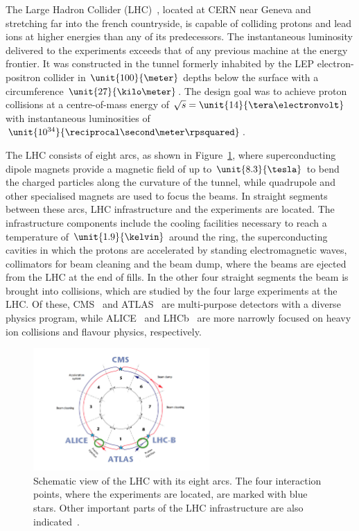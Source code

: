The Large Hadron Collider (LHC)~\cite{LHC}, located at CERN near Geneva and stretching far into the french countryside, is capable of colliding protons and lead ions at higher energies than any of its predecessors. The instantaneous luminosity delivered to the experiments exceeds that of any previous machine at the energy frontier. It was constructed in the tunnel formerly inhabited by the LEP electron-positron collider in $\unit{100}{\meter}$ depths below the surface with a circumference $\unit{27}{\kilo\meter}$. The design goal was to achieve proton collisions at a centre-of-mass energy of $\sqrt{s} = \unit{14}{\tera\electronvolt}$ with instantaneous luminosities of $\unit{10^{34}}{\reciprocal\second\meter\rpsquared}$. 

The LHC consists of eight arcs, as shown in Figure~\ref{fig:LHC}, where superconducting dipole magnets provide a magnetic field of up to $\unit{8.3}{\tesla}$ to bend the charged particles along the curvature of the tunnel, while quadrupole and other specialised magnets are used to focus the beams. In straight segments between these arcs, LHC infrastructure and the experiments are located. The infrastructure components include the cooling facilities necessary to reach a temperature of $\unit{1.9}{\kelvin}$ around the ring, the superconducting cavities in which the protons are accelerated by standing electromagnetic waves, collimators for beam cleaning and the beam dump, where the beams are ejected from the LHC at the end of fills. In the other four straight segments the beam is brought into collisions, which are studied by the four large experiments at the LHC. Of these, CMS~\cite{CMS} and ATLAS~\cite{ATLAS} are multi-purpose detectors with a diverse physics program, while ALICE~\cite{ATLAS} and LHCb~\cite{LHCb} are more narrowly focused on heavy ion collisions and flavour physics, respectively. 

\begin{figure}[htbp]
\centering
  \includegraphics[width=0.6\textwidth]{plots/LHC/LHC_scetch.png}
\caption{Schematic view of the LHC with its eight arcs. The four interaction points, where the experiments are located, are marked with blue stars. Other important parts of the LHC infrastructure are also indicated~\cite{LHCScetch}.}
\label{fig:LHC}
\end{figure}

